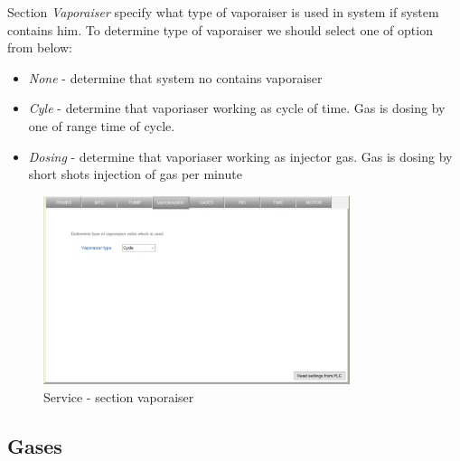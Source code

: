 Section \textit{Vaporaiser} specify what type of vaporaiser is used in system if system contains him. To determine type of vaporaiser we should select one of option from below: 
\begin{itemize}
\item \textit{None} - determine that system no contains vaporaiser 
\item \textit{Cyle} - determine that vaporiaser working as cycle of time. Gas is dosing by one of range time of cycle.
\item \textit{Dosing} - determine that vaporiaser working as injector gas. Gas is dosing by short shots injection of gas per minute
\end{itemize}
	\begin{figure}[!h] 
	\centering \includegraphics[width=0.8\textwidth]{Graphic/Service/Vaporaiser.png}	
	\caption{Service - section vaporaiser}
	\label{alerts_window}
	\end{figure}
	\FloatBarrier

\subsection{Gases}

